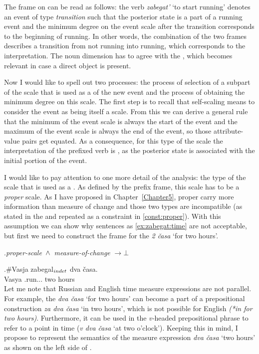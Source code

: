 The frame on  can be read as follows: the verb \textit{zabegat'} `to start running' denotes an event of type \textit{transition} such that the posterior state is a part of a running event and the minimum degree on the event scale after the transition corresponds to the beginning of running. In other words, the combination of the two frames describes a transition from not running into running, which corresponds to the  interpretation. The noun dimension has to agree with the , which becomes relevant in case a direct object is present.

Now I would like to spell out two processes: the process of selection of a subpart of the scale that is used as a  of the new event and the process of obtaining the minimum degree on this scale. The first step is to recall that self-scaling means to consider the event as being itself a scale. From this we can derive a general rule that the minimum of the event scale is always the start of the event and the maximum of the event scale is always the end of the event, so those attribute-value pairs get equated. As a consequence, for this type of the scale the interpretation of the prefixed verb is , as the posterior state is associated with the initial portion of the event.

I would like to pay attention to one more detail of the analysis: the type of the scale that is used as a . As defined by the prefix frame, this scale has to be a \textit{proper} scale. As I have proposed in Chapter~\ref{Chapter5}, proper  carry more information than measure of change  and those two types are incompatible (as stated in the  and repeated as a constraint in \ref{const:proper}). With this assumption we can show why sentences as \ref{ex:zabegat:time} are not acceptable, but first we need to construct the frame for the  \textit{2 \v{c}asa} `for two hours'. 

\ex.\label{const:proper}\textit{proper-scale} $\,\wedge\,$ \textit{measure-of-change} $\rightarrow \bot$

\exg.\label{ex:zabegat:time}\#Vasja zabegal$_{\normalfont indet}$ dva \v{c}asa.\\
Vasya .run... two hours\\

Let me note that Russian and English time measure expressions are not parallel. For example, the  \textit{dva \v{c}asa} `for two hours' can become a part of a prepositional construction \textit{za dva \v{c}asa} `in two hours', which is not possible for English \textit{(*in for two hours)}. Furthermore, it can be used in the \textit{v-}headed prepositional phrase to refer to a point in time (\textit{v dva \v{c}asa} `at two o'clock'). Keeping this in mind, I propose to represent the semantics of the measure expression \textit{dva \v{c}asa} `two hours' as shown on the left side of . 

